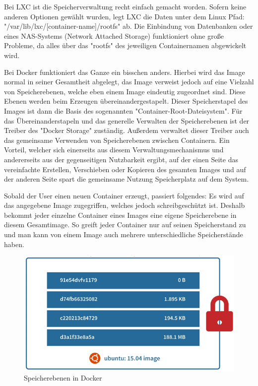 
Bei LXC ist die Speicherverwaltung recht einfach gemacht worden. Sofern keine anderen Optionen gewählt wurden, legt LXC die Daten unter dem Linux Pfad: "/var/lib/lxc/[container-name]/rootfs" ab. Die Einbindung von Datenbanken oder eines NAS-Systems (Network Attached Storage) funktioniert ohne große Probleme, da alles über das "rootfs" des jeweiligen Containernamen abgewickelt wird. \cite{LxcVsDocker}

Bei Docker funktioniert das Ganze ein bisschen anders. Hierbei wird das Image normal in seiner Gesamtheit abgelegt, das Image verweist jedoch auf eine Vielzahl von Speicherebenen, welche eben einem Image eindeutig zugeordnet sind. Diese Ebenen werden beim Erzeugen übereinandergestapelt. Dieser Speicherstapel des Images ist dann die Basis des sogenannten "Container-Root-Dateisystem". Für das Übereinanderstapeln und das generelle Verwalten der Speicherebenen ist der Treiber des "Docker Storage" zuständig. Außerdem verwaltet dieser Treiber auch das gemeinsame Verwenden von Speicherebenen zwischen Containern. Ein Vorteil, welcher sich einerseits aus diesem Verwaltungsmechanismus und andererseits aus der gegenseitigen Nutzbarkeit ergibt, auf der einen Seite das vereinfachte Erstellen, Verschieben oder Kopieren des gesamten Images und auf der anderen Seite spart die gemeinsame Nutzung Speicherplatz auf dem System. \cite{LxcVsDocker}

Sobald der User einen neuen Container erzeugt, passiert folgendes: Es wird auf das angegebene Image zugegriffen, welches jedoch schreibgeschützt ist. Deshalb bekommt jeder einzelne Container eines Images eine eigene Speicherebene in diesem Gesamtimage. So greift jeder Container nur auf seinen Speicherstand zu und man kann von einem Image auch mehrere unterschiedliche Speicherstände haben. \cite{LxcVsDocker}

\begin{figure}[H]
    \centering
    \includegraphics{media/DockerAndContainering/Speicherebenen.png}
    \caption{Speicherebenen in Docker \cite{LxcVsDocker}}
\end{figure}

